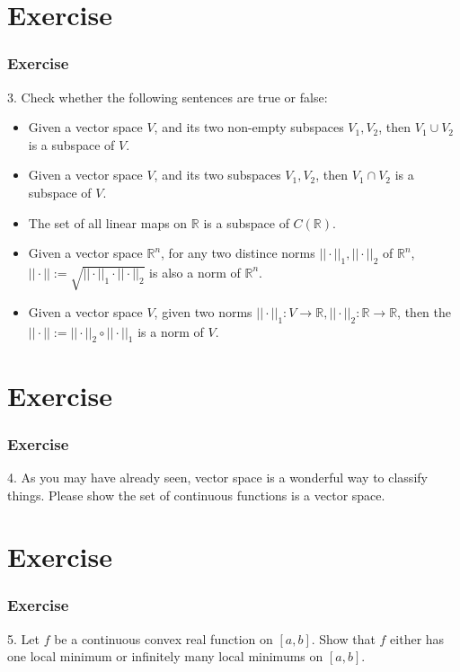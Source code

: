 \documentclass[12pt, t]{beamer}
\begin{document}
\section{Exercise}
\begin{frame}
    \frametitle{Exercise}
3. Check whether the following sentences are true or false:
\begin{itemize}
    \item Given a vector space $V$, and its two non-empty subspaces $V_1, V_2$, then $V_1\cup V_2$ is a subspace of $V$.
    \item Given a vector space $V$, and its two subspaces $V_1,V_2$, then $V_1\cap V_2$ is a subspace of $V$.
    \item The set of all linear maps on $\mathbb{R}$ is a subspace of $C(\mathbb{R})$.
    \item Given a vector space $\mathbb{R}^n$, for any two distince norms $||\cdot||_1, ||\cdot||_2$ of $\mathbb{R}^n$, $||\cdot||:=\sqrt{||\cdot||_1\cdot||\cdot||_2}$ is also a norm of $\mathbb{R}^n$.
    \item Given a vector space $V$, given two norms $||\cdot||_1:V\rightarrow\mathbb{R}, ||\cdot||_2:\mathbb{R}\rightarrow\mathbb{R}$, then the $||\cdot||:=||\cdot||_2\circ||\cdot||_1$ is a norm of $V$.
\end{itemize}
\end{frame}

\section{Exercise}
\begin{frame}
    \frametitle{Exercise}
4. As you may have already seen, vector space is a wonderful way to classify things. Please show the set of continuous functions is a vector space.
\end{frame}

\section{Exercise}
\begin{frame}
    \frametitle{Exercise}
5. Let $f$ be a continuous convex real function on $[a,b]$. Show that $f$ either has one local minimum or infinitely many local minimums on $[a,b]$.
\end{frame}
\end{document}
